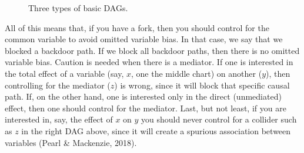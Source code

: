 \documentclass[
  super,
  preprint,
  3p]{elsarticle}
\begin{document}
\begin{figure}
\begin{minipage}[t]{0.33\linewidth}
{{}

}

\end{minipage}%
%
\begin{minipage}[t]{0.33\linewidth}

{\centering 


}

\end{minipage}%

\caption{\label{fig-basicdag}Three types of basic DAGs.}

\end{figure}

All of this means that, if you have a fork, then you should control for
the common variable to avoid omitted variable bias. In that case, we say
that we blocked a backdoor path. If we block all backdoor paths, then
there is no omitted variable bias. Caution is needed when there is a
mediator. If one is interested in the total effect of a variable (say,
\(x\), one the middle chart) on another (\(y\)), then controlling for
the mediator (\(z\)) is wrong, since it will block that specific causal
path. If, on the other hand, one is interested only in the direct
(unmediated) effect, then one should control for the mediator. Last, but
not least, if you are interested in, say, the effect of \(x\) on \(y\)
you should never control for a collider such as \(z\) in the right DAG
above, since it will create a spurious association between variables
(Pearl \& Mackenzie, 2018).
\end{document}
